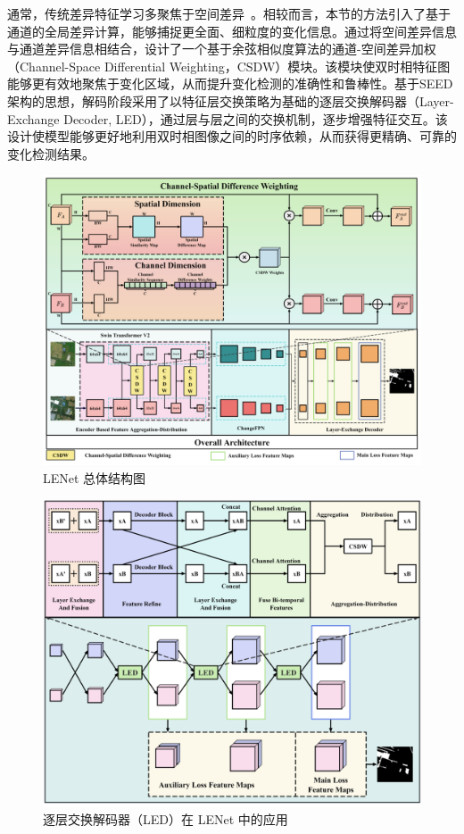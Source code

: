 通常，传统差异特征学习多聚焦于空间差异~\cite{dong_changeclip_2024, feng_change_2023, shi_deeply_2022}。相较而言，本节的方法引入了基于通道的全局差异计算，能够捕捉更全面、细粒度的变化信息。通过将空间差异信息与通道差异信息相结合，设计了一个基于余弦相似度算法的通道-空间差异加权（Channel-Space Differential Weighting，CSDW）模块。该模块使双时相特征图能够更有效地聚焦于变化区域，从而提升变化检测的准确性和鲁棒性。基于SEED架构的思想，解码阶段采用了以特征层交换策略为基础的逐层交换解码器（Layer-Exchange Decoder, LED），通过层与层之间的交换机制，逐步增强特征交互。该设计使模型能够更好地利用双时相图像之间的时序依赖，从而获得更精确、可靠的变化检测结果。


\begin{figure}[!htb]
  \centering
  \includegraphics[width=\textwidth]{paper_figures/基于双时相遥感影像特征交互的变化检测算法研究/LENet/lenet.png}
  \caption{LENet 总体结构图}
  \label{fig:lenet}
\end{figure}

\begin{figure}[!htb]
  \centering
  \includegraphics[width=\textwidth]{paper_figures/基于双时相遥感影像特征交互的变化检测算法研究/LENet/led.png}
  \caption{逐层交换解码器（LED）在 LENet 中的应用}
  \label{fig:led}
\end{figure}

